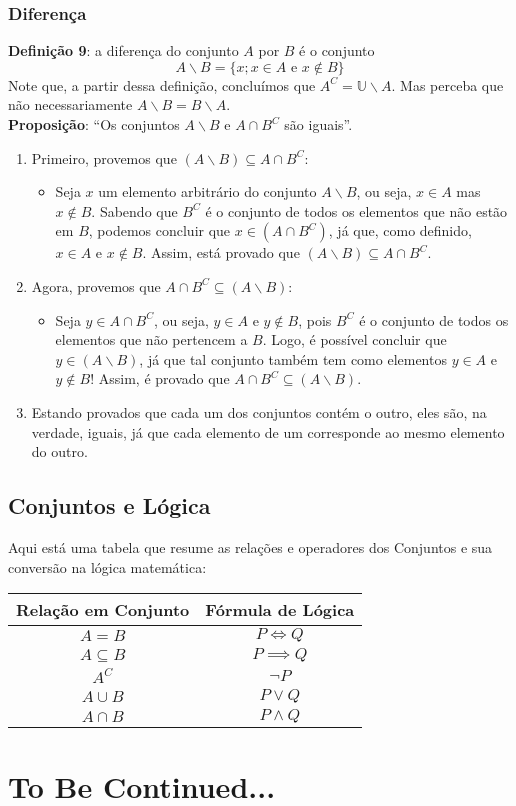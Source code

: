 \documentclass{article}
\begin{document}
\subsubsection{Diferença}
\textbf{Definição 9}: a diferença do conjunto $A$ por $B$ é o conjunto
\begin{displaymath}
    A \backslash B = \{x; x \in A \text{ e } x \notin B \}
\end{displaymath}
Note que, a partir dessa definição, concluímos que $A^C = \mathbb{U} \backslash A$. Mas perceba que não necessariamente $A \backslash B = B \backslash A$. 
\\
\textbf{Proposição}: \enquote{Os conjuntos $A \backslash B$ e $A \cap B^C$ são iguais}.
\begin{enumerate}
    \item Primeiro, provemos que $(A \backslash B) \subseteq A \cap B^C$:
    \begin{itemize}
        \item Seja $x$ um elemento arbitrário do conjunto $A \backslash B$, ou seja, $x \in A$ mas $x \notin B$. Sabendo que $B^C$ é o conjunto de todos os elementos que não estão em $B$, podemos concluir que $x \in (A \cap B^C)$, já que, como definido, $x \in A$ e $x \notin B$. Assim, está provado que $(A \backslash B) \subseteq A \cap B^C$.
    \end{itemize}
    \item Agora, provemos que $A \cap B^C \subseteq (A \backslash B)$:
    \begin{itemize}
        \item Seja $y \in A \cap B^C$, ou seja, $y \in A$ e $y \notin B$, pois $B^C$ é o conjunto de todos os elementos que não pertencem a $B$. Logo, é possível concluir que $y \in (A \backslash B)$, já que tal conjunto também tem como elementos $y \in A$ e $y \notin B$! Assim, é provado que $A \cap B^C \subseteq (A \backslash B)$.
    \end{itemize}
    \item Estando provados que cada um dos conjuntos contém o outro, eles são, na verdade, iguais, já que cada elemento de um corresponde ao mesmo elemento do outro.
\end{enumerate}
\subsection{Conjuntos e Lógica}
Aqui está uma tabela que resume as relações e operadores dos Conjuntos e sua conversão na lógica matemática:
\begin{center}
    \begin{tabular}{c|c}
        Relação em Conjunto & Fórmula de Lógica  \\
        \hline
        $A = B$ & $P \iff Q$ \\
        $A \subseteq B$ & $P \implies Q $\\
        $A^C $ & $ \lnot P$ \\
        $A \cup B$ & $P \vee Q $ \\
        $ A \cap B$ & $P \land Q $ \\
    \end{tabular}
\end{center}

\section{To Be Continued...}
\end{document}
